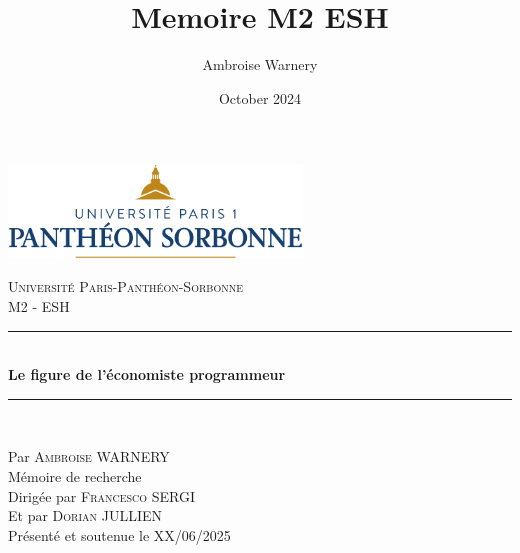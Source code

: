 \documentclass[a4paper,12pt,twoside,french]{book}
\title{Memoire M2 ESH}
\author{Ambroise Warnery}
\date{October 2024}
\begin{document}
\begin{titlepage}
    \begin{center}
            \includegraphics[height=2.5cm]{figures/cover/logoparis1.png}
    \end{center}

    \begin{center}
    
\vspace*{.03\textheight}
\textsc{\LARGE Université Paris-Panthéon-Sorbonne}\\[0.2cm] %
    \large M2 - ESH\\
          \vfill

         \rule{\textwidth}{0.8pt} \\ %
         \vspace{10pt}
          { \LARGE \bfseries Le figure de l'économiste programmeur} %
          \vspace{10pt}
          \rule{\textwidth}{0.8pt} \\ %
    \end{center}
    
    \vfill
    \begin{center}
        Par \textsc{\Large Ambroise WARNERY}\\[1cm] 
        Mémoire de recherche\\[1.2cm]
        Dirigée par \textsc{\large Francesco SERGI}\\[0.2cm]
        Et par \textsc{\large Dorian JULLIEN}\\[0.2cm] 
        Présenté et soutenue le XX/06/2025 %
    \end{center}
    
    \vspace{1cm}


\newpage %
\thispagestyle{empty} %
\end{titlepage}
\end{document}
